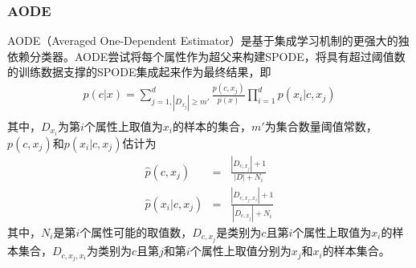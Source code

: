 \subsubsection{AODE}
AODE（Averaged One-Dependent Estimator）是基于集成学习机制的更强大的独依赖分类器。AODE尝试将每个属性作为超父来构建SPODE，将具有超过阈值数的训练数据支撑的SPODE集成起来作为最终结果，即
\begin{eqnarray}
	p(c|x)=\sum_{j=1,|D_{x_j}|\geq m'}^d \frac{p(c,x_j)}{p(x)}\prod_{i=1}^dp(x_i|c,x_j)\\
\end{eqnarray}
其中，$D_{x_i}$为第$i$个属性上取值为$x_i$的样本的集合，$m'$为集合数量阈值常数，$p(c,x_j)$和$p(x_i|c,x_j)$估计为
\begin{eqnarray}
	\hat{p}(c,x_j)&=&\frac{|D_{c,x_j}|+1}{|D|+N_i}\\
	\hat{p}(x_i|c,x_j)&=&\frac{|D_{c,x_j,x_i}|+1}{|D_{c,x_j}|+N_i}
\end{eqnarray}
其中，$N_i$是第$i$个属性可能的取值数，$D_{c,x_j}$是类别为$c$且第$i$个属性上取值为$x_i$的样本集合，$D_{c,x_j,x_i}$为类别为$c$且第$j$和第$i$个属性上取值分别为$x_j$和$x_i$的样本集合。


















